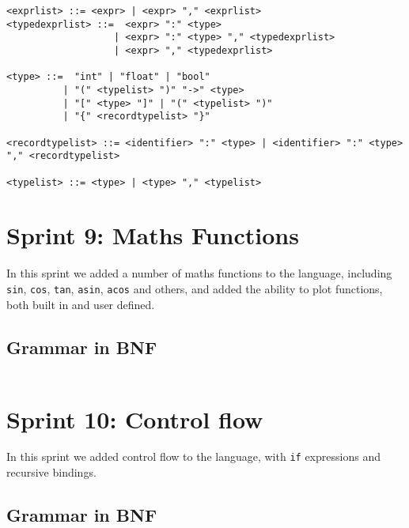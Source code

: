 \begin{verbatim}
<exprlist> ::= <expr> | <expr> "," <exprlist>
<typedexprlist> ::=  <expr> ":" <type> 
                   | <expr> ":" <type> "," <typedexprlist>
                   | <expr> "," <typedexprlist>
    
<type> ::=  "int" | "float" | "bool" 
          | "(" <typelist> ")" "->" <type> 
          | "[" <type> "]" | "(" <typelist> ")"
          | "{" <recordtypelist> "}"
          
<recordtypelist> ::= <identifier> ":" <type> | <identifier> ":" <type> "," <recordtypelist>

<typelist> ::= <type> | <type> "," <typelist>
\end{verbatim}

\section{Sprint 9: Maths Functions}\label{sec:maths-funcs}

In this sprint we added a number of maths functions to the language, including \texttt{sin}, \texttt{cos}, \texttt{tan},
\texttt{asin}, \texttt{acos} and others, and added the ability to plot functions, both built in and user defined.

\subsection{Grammar in BNF}\label{subsec:grammar-in-bnf9}

\begin{verbatim}
\end{verbatim}

\section{Sprint 10: Control flow}\label{sec:control-flow}

In this sprint we added control flow to the language, with \texttt{if} expressions and recursive bindings.

\subsection{Grammar in BNF}\label{subsec:grammar-in-bnf10}

